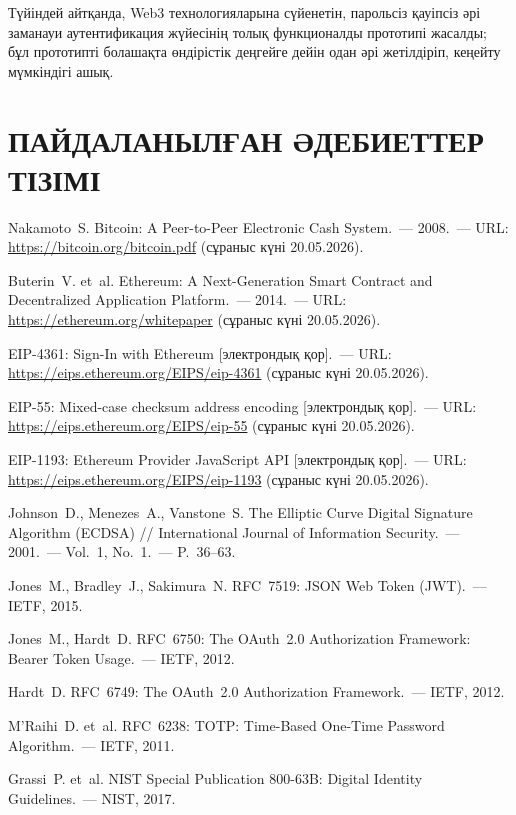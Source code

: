 \documentclass[14pt,a4paper]{extarticle}
\begin{document}
Түйіндей айтқанда, Web3 технологияларына сүйенетін, парольсіз қауіпсіз әрі заманауи аутентификация жүйесінің толық функционалды прототипі жасалды; бұл прототипті болашақта өндірістік деңгейге дейін одан әрі жетілдіріп, кеңейту мүмкіндігі ашық.

\newpage
\section*{ПАЙДАЛАНЫЛҒАН ӘДЕБИЕТТЕР ТІЗІМІ}

\begin{enumerate}[label={[\arabic*]}, nosep]
\item Nakamoto~S. Bitcoin: A Peer-to-Peer Electronic Cash System.~--- 2008.~--- URL: \url{https://bitcoin.org/bitcoin.pdf} (сұраныс күні 20.05.2026).
\item Buterin~V. et~al. Ethereum: A Next-Generation Smart Contract and Decentralized Application Platform.~--- 2014.~--- URL: \url{https://ethereum.org/whitepaper} (сұраныс күні 20.05.2026).
\item EIP-4361: Sign-In with Ethereum [электрондық қор].~--- URL: \url{https://eips.ethereum.org/EIPS/eip-4361} (сұраныс күні 20.05.2026).
\item EIP-55: Mixed-case checksum address encoding [электрондық қор].~--- URL: \url{https://eips.ethereum.org/EIPS/eip-55} (сұраныс күні 20.05.2026).
\item EIP-1193: Ethereum Provider JavaScript API [электрондық қор].~--- URL: \url{https://eips.ethereum.org/EIPS/eip-1193} (сұраныс күні 20.05.2026).
\item Johnson~D., Menezes~A., Vanstone~S. The Elliptic Curve Digital Signature Algorithm (ECDSA) // International Journal of Information Security.~--- 2001.~--- Vol.~1, No.~1.~--- P.~36--63.
\item Jones~M., Bradley~J., Sakimura~N. RFC~7519: JSON Web Token (JWT).~--- IETF, 2015.
\item Jones~M., Hardt~D. RFC~6750: The OAuth~2.0 Authorization Framework: Bearer Token Usage.~--- IETF, 2012.
\item Hardt~D. RFC~6749: The OAuth~2.0 Authorization Framework.~--- IETF, 2012.
\item M'Raihi~D. et~al. RFC~6238: TOTP: Time-Based One-Time Password Algorithm.~--- IETF, 2011.
\item Grassi~P. et~al. NIST Special Publication 800-63B: Digital Identity Guidelines.~--- NIST, 2017.

\end{enumerate}
\end{document}
